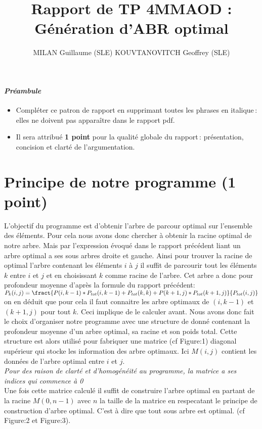 \documentclass[a4paper, 10pt, french]{article}
\title{Rapport de TP 4MMAOD : Génération d'ABR optimal}
\author{
MILAN Guillaume (SLE) 
KOUVTANOVITCH Geoffrey (SLE) 
}
\begin{document}
\maketitle

\paragraph{\em Préambule}
{\em \begin{itemize} 
   \item Compléter ce patron de rapport en supprimant toutes les phrases en italique\,: elles ne doivent pas apparaître dans le rapport pdf.
   \item Il sera attribué {\bf 1 point} pour la qualité globale du rapport\,: présentation, concision et clarté de l'argumentation.
\end{itemize}
}

\section{Principe de notre  programme (1 point)}
L'objectif du programme est d'obtenir l'arbre de parcour optimal sur l'ensemble des éléments. Pour cela nous avons donc chercher à obtenir la racine optimal de notre arbre. Mais par l'expression évoqué dans le rapport précédent liant un arbre optimal a ses sous arbres droite et gauche. 
Ainsi pour trouver la racine de optimal l'arbre contenant les éléments $i$ à $j$ il suffit de parcourir tout les éléments $k$ entre $i$ et $j$ et en choisissant $k$ comme racine de l'arbre. 
Cet arbre a donc pour profondeur moyenne d'après la formule du rapport précédent: \\
$P_k(i,j)=\fract{P(i,k-1)*P_{tot}(i,k-1)+P_{tot}(k,k)+P(k+1,j)*P_{tot}(k+1,j)}{P_{tot}(i,j)}$ \\
on en déduit que pour cela il faut connaitre les arbre optimaux de $(i,k-1)$ et $(k+1,j)$ pour tout $k$. Ceci implique de le calculer avant. 
Nous avons donc fait le choix d'organiser notre programme avec une structure de donné contenant la profondeur moyenne d'un arbre optimal, sa racine et son poids total. 
Cette structure est alors utilisé pour fabriquer une matrice (cf Figure:1) diagonal supérieur qui stocke les information des arbre optimaux. 
Ici $M(i,j)$ contient les données de l'arbre optimal entre $i$ et $j$. \\
{\em Pour des raison de clarté et d'homogénéité au programme, la matrice a ses indices qui commence à 0}\\
Une fois cette matrice calculé il suffit de construire l'arbre optimal en partant de la racine $M(0,n-1)$ avec $n$ la taille de la matrice en respecatant le principe de construction d'arbre optimal. C'est à dire que tout sous arbre est optimal. (cf Figure:2 et Figure:3).
\end{document}
